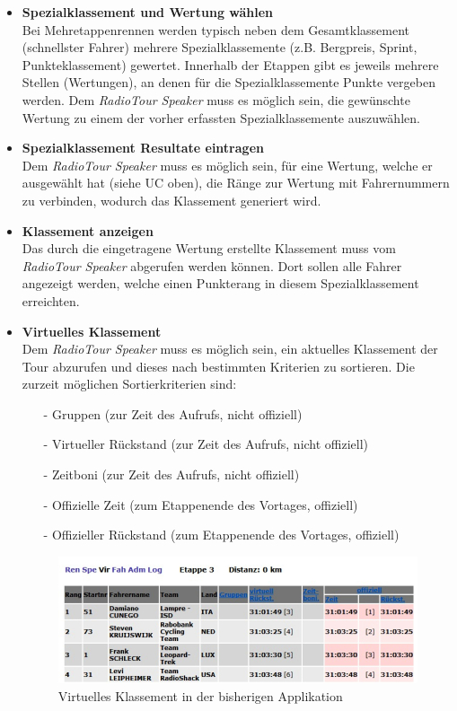 \begin{itemize}
\item \textbf{Spezialklassement und Wertung wählen}\\
Bei Mehretappenrennen werden typisch neben dem Gesamtklassement (schnellster Fahrer) mehrere Spezialklassemente (z.B. Bergpreis, Sprint, Punkteklassement) gewertet. Innerhalb der Etappen gibt es jeweils mehrere Stellen (Wertungen), an denen für die Spezialklassemente Punkte vergeben werden. Dem \textit{RadioTour Speaker} muss es möglich sein, die gewünschte Wertung zu einem der vorher erfassten Spezialklassemente auszuwählen.

\item \textbf{Spezialklassement Resultate eintragen}\\
Dem \textit{RadioTour Speaker} muss es möglich sein, für eine Wertung, welche er ausgewählt hat (siehe UC oben), die Ränge zur Wertung mit Fahrernummern zu verbinden, wodurch das Klassement generiert wird.

\item \textbf{Klassement anzeigen}\\
Das durch die eingetragene Wertung erstellte Klassement muss vom \textit{RadioTour Speaker} abgerufen werden können. Dort sollen alle Fahrer angezeigt werden, welche einen Punkterang in diesem Spezialklassement erreichten.

\item \textbf{Virtuelles Klassement}\\
Dem \textit{RadioTour Speaker} muss es möglich sein, ein aktuelles Klassement der Tour abzurufen und dieses nach bestimmten Kriterien zu sortieren. Die zurzeit möglichen Sortierkriterien sind:
\begin{itemize}
\item[-]Gruppen (zur Zeit des Aufrufs, nicht offiziell)
\item[-]Virtueller Rückstand (zur Zeit des Aufrufs, nicht offiziell)
\item[-]Zeitboni (zur Zeit des Aufrufs, nicht offiziell)
\item[-]Offizielle Zeit (zum Etappenende des Vortages, offiziell)
\item[-]Offizieller Rückstand (zum Etappenende des Vortages, offiziell)
\end{itemize}

\begin{figure}[h!]
  \caption{Virtuelles Klassement in der bisherigen Applikation}

  \begin{center}
    \includegraphics[scale=0.9]{05bericht/images/uc05_virtuell.png}
  \end{center}
\end{figure}


\end{itemize}
